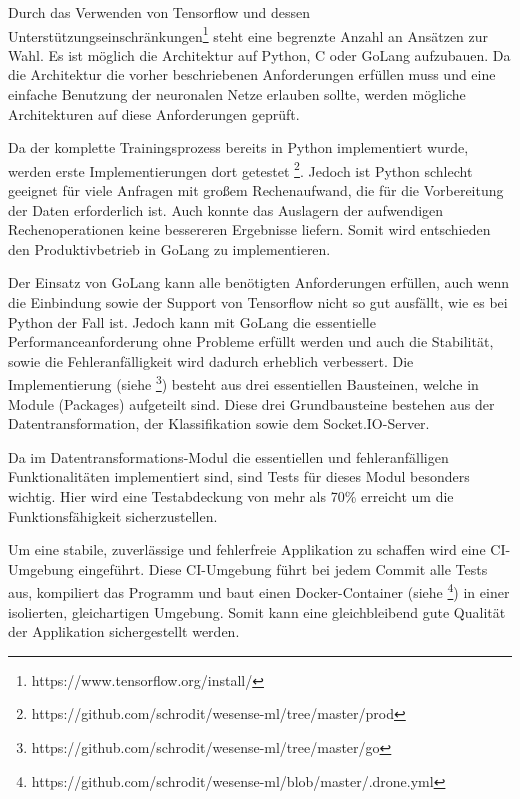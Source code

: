         Durch das Verwenden von Tensorflow und dessen Unterstützungseinschränkungen\footnote{https://www.tensorflow.org/install/} steht eine begrenzte Anzahl an Ansätzen zur Wahl.
        Es ist möglich die Architektur auf Python, C oder GoLang aufzubauen.
        Da die Architektur die vorher beschriebenen Anforderungen erfüllen muss und eine einfache Benutzung der neuronalen Netze erlauben sollte, werden mögliche Architekturen auf diese Anforderungen geprüft.
        \newline

        Da der komplette Trainingsprozess bereits in Python implementiert wurde, werden erste Implementierungen dort getestet \footnote{https://github.com/schrodit/wesense-ml/tree/master/prod}.
        Jedoch ist Python schlecht geeignet für viele Anfragen mit großem Rechenaufwand, die für die Vorbereitung der Daten erforderlich ist.
        Auch konnte das Auslagern der aufwendigen Rechenoperationen keine bessereren Ergebnisse liefern.
        Somit wird entschieden den Produktivbetrieb in GoLang zu implementieren.
        \newline

        Der Einsatz von GoLang kann alle benötigten Anforderungen erfüllen, auch wenn die Einbindung sowie der Support von Tensorflow nicht so gut ausfällt, wie es bei Python der Fall ist.
        Jedoch kann mit GoLang die essentielle Performanceanforderung ohne Probleme erfüllt werden und auch die Stabilität, sowie die Fehleranfälligkeit wird dadurch erheblich verbessert.
        Die Implementierung (siehe \footnote{https://github.com/schrodit/wesense-ml/tree/master/go}) besteht aus drei essentiellen Bausteinen, welche in Module (Packages) aufgeteilt sind.
        Diese drei Grundbausteine bestehen aus der Datentransformation, der Klassifikation sowie dem Socket.IO-Server.
        \newline

        Da im Datentransformations-Modul die essentiellen und fehleranfälligen Funktionalitäten implementiert sind, sind Tests für dieses Modul besonders wichtig.
        Hier wird eine Testabdeckung von mehr als 70\% erreicht um die Funktionsfähigkeit sicherzustellen.
        \newline

        Um eine stabile, zuverlässige und fehlerfreie Applikation zu schaffen wird eine \ac{CI}-Umgebung eingeführt.
        Diese \ac{CI}-Umgebung führt bei jedem Commit alle Tests aus, kompiliert das Programm und baut einen Docker-Container (siehe \footnote{https://github.com/schrodit/wesense-ml/blob/master/.drone.yml}) in einer isolierten, gleichartigen Umgebung.
        Somit kann eine gleichbleibend gute Qualität der Applikation sichergestellt werden.
    
